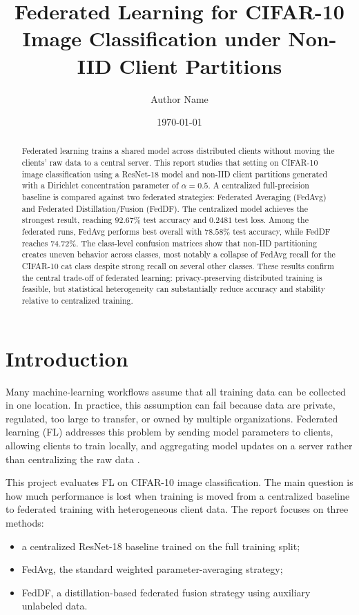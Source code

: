 \documentclass[11pt]{article}
\title{Federated Learning for CIFAR-10 Image Classification under Non-IID Client Partitions}
\author{Author Name}
\date{\today}
\begin{document}
\maketitle

\begin{abstract}
Federated learning trains a shared model across distributed clients without moving the clients' raw data to a central server. This report studies that setting on CIFAR-10 image classification using a ResNet-18 model and non-IID client partitions generated with a Dirichlet concentration parameter of $\alpha=0.5$. A centralized full-precision baseline is compared against two federated strategies: Federated Averaging (FedAvg) and Federated Distillation/Fusion (FedDF). The centralized model achieves the strongest result, reaching $92.67\%$ test accuracy and $0.2481$ test loss. Among the federated runs, FedAvg performs best overall with $78.58\%$ test accuracy, while FedDF reaches $74.72\%$. The class-level confusion matrices show that non-IID partitioning creates uneven behavior across classes, most notably a collapse of FedAvg recall for the CIFAR-10 cat class despite strong recall on several other classes. These results confirm the central trade-off of federated learning: privacy-preserving distributed training is feasible, but statistical heterogeneity can substantially reduce accuracy and stability relative to centralized training.
\end{abstract}

\section{Introduction}

Many machine-learning workflows assume that all training data can be collected in one location. In practice, this assumption can fail because data are private, regulated, too large to transfer, or owned by multiple organizations. Federated learning (FL) addresses this problem by sending model parameters to clients, allowing clients to train locally, and aggregating model updates on a server rather than centralizing the raw data \cite{mcmahan2017communication,kairouz2021advances}.

This project evaluates FL on CIFAR-10 image classification. The main question is how much performance is lost when training is moved from a centralized baseline to federated training with heterogeneous client data. The report focuses on three methods:
\begin{itemize}
    \item a centralized ResNet-18 baseline trained on the full training split;
    \item FedAvg, the standard weighted parameter-averaging strategy;
    \item FedDF, a distillation-based federated fusion strategy using auxiliary unlabeled data.
\end{itemize}
\end{document}
